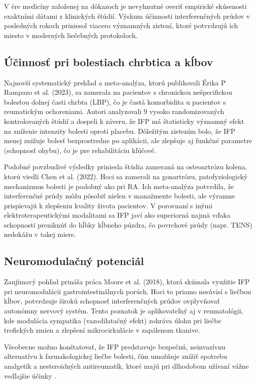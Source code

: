 V ére medicíny založenej na dôkazoch je nevyhnutné overiť empirické skúsenosti exaktními dátami z klinických štúdií. Výskum účinnosti interferenčných prúdov v posledných rokoch priniesol viacero významných zistení, ktoré potvrdzujú ich miesto v moderných liečebných protokoloch.

\subsection{Účinnosť pri bolestiach chrbtica a kĺbov}

Najnovší systematický prehľad a meta-analýza, ktorú publikovali Érika P Rampazo et al. (2023), sa zamerala na pacientov s chronickou nešpecifickou bolesťou dolnej časti chrbta (LBP), čo je častá komorbidita u pacientov s reumatickým ochoreniami. Autori analyzovali 9 vysoko randomizovaných kontrolovaných štúdií a dospeli k záveru, že IFP má štatisticky významný efekt na zníženie intenzity bolesti oproti placebu. Dôležitým zistením bolo, že IFP menej znižuje bolesť bezprostredne po aplikácii, ale zlepšuje aj funkčné parametre (schopnosť ohybu), čo je pre rehabilitáciu kľúčové.

Podobné povzbudivé výsledky priniesla štúdia zameraná na osteoartrózu kolena, ktorú viedli Chen et al. (2022). Hoci sa zamerali na gonartrózu, patofyziologický mechanizmus bolesti je podobný ako pri RA. Ich meta-analýza potvrdila, že interferenčné prúdy môžu pôsobiť nielen v manažmente bolesti, ale výramne prispievajú k zlepšeniu kvality života pacientov. V porovnaní s inými elektroterapeutickými modalitami sa IFP javí ako superiorná najmä vďaka schopnosti preniknúť do hĺbky kĺbneho púzdra, čo povrchové prúdy (napr. TENS) nedokážu v takej miere.

\subsection{Neuromodulačný potenciál}

Zaujímavý pohľad prináša práca Moore et al. (2018), ktorá skúmala využitie IFP pri neuromodulácii gastrointestinálnych porúch. Hoci to priamo nesúvisí s liečbou kĺbov, potvrdzuje širokú schopnosť interferenčných prúdov ovplyvňovať autonómny nervový systém. Tento poznatok je aplikovateľný aj v reumatológii, kde modulácia sympatika (vazodilatačný efekt) zohráva úlohu pri liečbe trofických zmien a zlepšení mikrocirkulácie v zapálenom tkanive.

Všeobecne možno konštatovať, že IFP predstavuje bezpečnú, neinvazívnu alternatívu k farmakologickej liečbe bolesti, čím umožňuje znížiť spotrebu analgetík a nesteroidných antireumatík, ktoré majú pri dlhodobom užívaní vážne vedľajšie účinky \parencite{Goats1990}.

